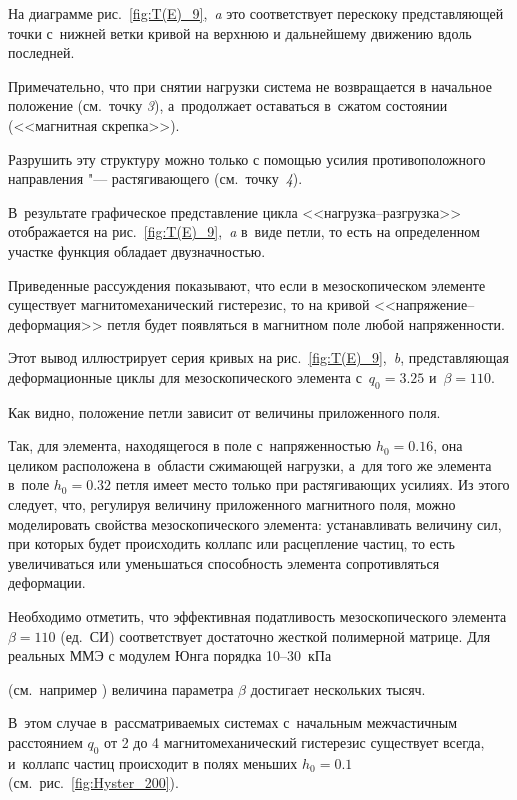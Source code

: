 На диаграмме рис.~\ref{fig:T(E)_9},~{\sl a} это соответствует перескоку представляющей точки с~нижней ветки кривой на верхнюю и дальнейшему движению вдоль последней. 

Примечательно, что при снятии нагрузки система не возвращается в начальное положение (см.~точку {\sl 3}\/), а~продолжает оставаться в~сжатом состоянии (<<магнитная скрепка>>). 

Разрушить эту структуру можно только с помощью усилия противоположного направления "--- растягивающего (см.~точку~{\sl 4}\/). 

В~результате графическое представление цикла <<нагрузка--разгрузка>> отображается на рис.~\ref{fig:T(E)_9},~{\sl a} в~виде петли, то есть на определенном участке функция обладает двузначностью.



Приведенные рассуждения показывают, что если в мезоскопическом элементе существует магнитомеханический гистерезис, то на кривой <<нап\-ря\-же\-ние--деформация>> петля будет появляться в магнитном поле любой напряженности. 

Этот вывод иллюстрирует серия кривых на рис.~\ref{fig:T(E)_9},~{\sl b}, представляющая деформационные циклы для мезоскопического элемента с~$q_0=3.25$ и~$\beta=110$. 

Как видно, положение петли зависит от величины приложенного поля. 

Так, для элемента, находящегося в поле с~напряженностью $h_0=0.16$, она целиком расположена в~области сжимающей нагрузки, а~для того же элемента в~поле $h_0=0.32$  петля имеет место только при растягивающих усилиях. Из этого следует, что, регулируя величину приложенного магнитного поля, можно моделировать свойства мезоскопического элемента: устанавливать величину сил, при которых будет происходить коллапс или расцепление частиц, то есть увеличиваться или уменьшаться способность элемента сопротивляться деформации.



Необходимо отметить, что эффективная податливость мезоскопического элемента $\beta=110$ (ед.\ СИ) соответствует достаточно жесткой полимерной матрице. Для реальных ММЭ с модулем Юнга порядка 10--30~кПа 

(см.~например \cite{Stepanov_07}) величина параметра $\beta$ достигает нескольких тысяч. 

В~этом случае в~рассматриваемых системах с~начальным межчастичным расстоянием $q_0$ от 2 до 4 магнитомеханический гистерезис существует всегда, и~коллапс частиц происходит в полях меньших $h_0=0.1$ (см.~рис.~\ref{fig:Hyster_200}).



